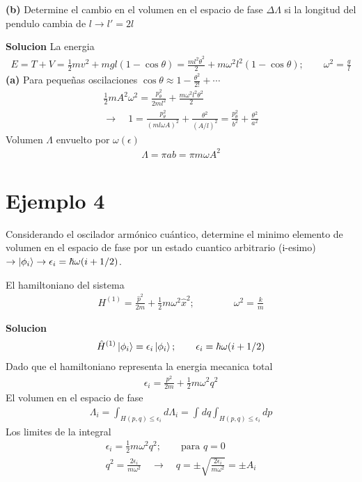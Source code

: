 \documentclass{article}
\begin{document}
\textbf{(b)} Determine el cambio en el volumen en el espacio de fase $ \Delta \Lambda $ si la longitud del pendulo cambia de $ l \rightarrow l' = 2l  $

\textbf{Solucion }
La energia 
\begin{gather*}
  E = T+V = \frac{1}{2} m v^2 + m gl (1- \cos{\theta}) = \frac{ml^2 \dot \theta^2 }{2} + m \omega^2 l^2 (1 - \cos{\theta }); \qquad \omega^2 = \frac{g}{l } 
\end{gather*}
\textbf{(a)} Para pequeñas oscilaciones $ \cos{\theta} \approx 1 - \frac{\theta^2 }{2! } + \cdots  $
\begin{gather*}
  \frac{1}{2} m A^2 \omega^2 = \frac{p_\theta^2 }{2m l^2 } + \frac{m \omega^2 l^2 \theta^2 }{2 } \\
  \rightarrow \quad 1 = \frac{p_\theta^2 }{(ml\omega A)^2 } + \frac{\theta^2 }{(A/l)^2 } = \frac{p_\theta^2 }{b^2 } + \frac{\theta^2 }{a^2 }
\end{gather*}
Volumen $ \Lambda $ envuelto por $ \omega(\epsilon) $ 
\begin{gather*}
  \Lambda = \pi ab = \pi m \omega A^2  
\end{gather*}

\section{Ejemplo 4 }
Considerando el oscilador armónico cuántico, determine el minimo elemento de volumen en el espacio de fase por un estado cuantico arbitrario (i-esimo) $ \rightarrow \ket{\phi_i } \rightarrow \epsilon_i = \hbar  \omega (i + 1/2 ) $.

El hamiltoniano del sistema 
\begin{gather*}
  H ^ {(1) } = \frac{\hat p ^2 }{2m } + \frac{1}{2} m \omega^2 \hat x ^2 ; \qquad \qquad \omega^2 = \frac{k }{m } 
\end{gather*}

\textbf{Solucion } 
\begin{gather*}
  \hat H ^ {(1) } \ket{\phi_i }= \epsilon_i \ket{\phi_i }; \qquad  \epsilon_i = \hbar  \omega (i + 1/2 )
\end{gather*}
Dado que el hamiltoniano representa la energia mecanica total 
\begin{gather*}
  \epsilon_i = \frac{p^2 }{2m } + \frac{1}{2} m \omega^2 q^2  
\end{gather*}
El volumen en el espacio de fase 
\begin{gather*}
  \Lambda_i = \int_{H(p,q) \leq \epsilon_i }^{}d\Lambda_i = \int_{}^{} dq \int_{H(p,q) \leq \epsilon_i }^{} dp  
\end{gather*}
Los limites de la integral 
\begin{gather*}
  \epsilon_i = \frac{1}{2} m \omega^2 q^2 ; \qquad \text{para }q = 0 \\
  q^2 = \frac{2 \epsilon_i }{m \omega^2 } \quad \rightarrow \quad q = \pm \sqrt{\frac{2 \epsilon_i }{m \omega^2 }} = \pm A_i 
\end{gather*}
\end{document}
